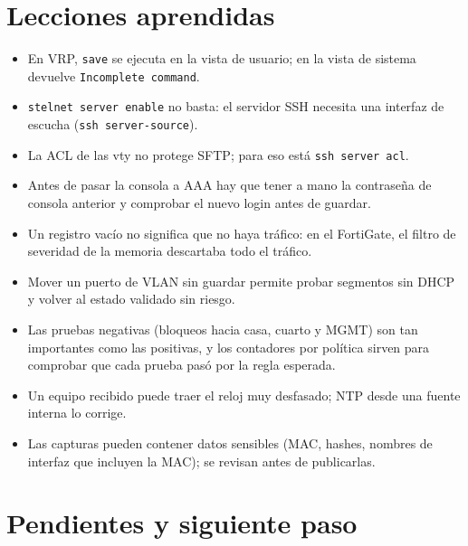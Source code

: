 \documentclass[11pt,a4paper]{article}
\begin{document}
\section{Lecciones aprendidas}
\begin{itemize}
  \item En VRP, \texttt{save} se ejecuta en la vista de usuario; en la vista de sistema devuelve \texttt{Incomplete command}.
  \item \texttt{stelnet server enable} no basta: el servidor SSH necesita una interfaz de escucha (\texttt{ssh server-source}).
  \item La ACL de las vty no protege SFTP; para eso está \texttt{ssh server acl}.
  \item Antes de pasar la consola a AAA hay que tener a mano la contraseña de consola anterior y comprobar el nuevo login antes de guardar.
  \item Un registro vacío no significa que no haya tráfico: en el FortiGate, el filtro de severidad de la memoria descartaba todo el tráfico.
  \item Mover un puerto de VLAN sin guardar permite probar segmentos sin DHCP y volver al estado validado sin riesgo.
  \item Las pruebas negativas (bloqueos hacia casa, cuarto y MGMT) son tan importantes como las positivas, y los contadores por política sirven para comprobar que cada prueba pasó por la regla esperada.
  \item Un equipo recibido puede traer el reloj muy desfasado; NTP desde una fuente interna lo corrige.
  \item Las capturas pueden contener datos sensibles (MAC, hashes, nombres de interfaz que incluyen la MAC); se revisan antes de publicarlas.
\end{itemize}

\newpage
\section{Pendientes y siguiente paso}
\end{document}
